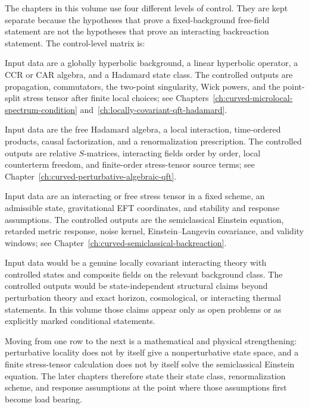The chapters in this volume use four different levels of control.  They are
kept separate because the hypotheses that prove a fixed-background free-field
statement are not the hypotheses that prove an interacting backreaction
statement.
The control-level matrix is:
\begin{description}[leftmargin=0pt,labelindent=0pt]
\item[Fixed-background free theory.]
Input data are a globally hyperbolic background, a linear hyperbolic
operator, a CCR or CAR algebra, and a Hadamard state class.  The controlled
outputs are propagation, commutators, the two-point singularity, Wick powers,
and the point-split stress tensor after finite local choices; see
Chapters~\ref{ch:curved-microlocal-spectrum-condition}
and~\ref{ch:locally-covariant-qft-hadamard}.

\item[Perturbative interacting theory.]
Input data are the free Hadamard algebra, a local interaction,
time-ordered products, causal factorization, and a renormalization
prescription.  The controlled outputs are relative \(S\)-matrices,
interacting fields order by order, local counterterm freedom, and
finite-order stress-tensor source terms; see
Chapter~\ref{ch:curved-perturbative-algebraic-qft}.

\item[Conditional semiclassical theory.]
Input data are an interacting or free stress tensor in a fixed scheme, an
admissible state, gravitational EFT coordinates, and stability and response
assumptions.  The controlled outputs are the semiclassical Einstein equation,
retarded metric response, noise kernel, Einstein--Langevin covariance, and
validity windows; see Chapter~\ref{ch:curved-semiclassical-backreaction}.

\item[Nonperturbative interacting curved QFT.]
Input data would be a genuine locally covariant interacting theory with
controlled states and composite fields on the relevant background class.
The controlled outputs would be state-independent structural claims beyond
perturbation theory and exact horizon, cosmological, or interacting thermal
statements.  In this volume those claims appear only as open problems or as
explicitly marked conditional statements.
\end{description}
Moving from one row to the next is a mathematical and physical strengthening:
perturbative locality does not by itself give a nonperturbative state space,
and a finite stress-tensor calculation does not by itself solve the
semiclassical Einstein equation.  The later chapters therefore state their
state class, renormalization scheme, and response assumptions at the point
where those assumptions first become load bearing.

